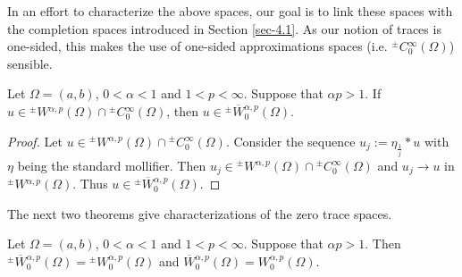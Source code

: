 \documentclass[leqno,final]{siamltex}
\numberwithin{equation}{section}
\renewcommand{\(}{\bigl(}
\renewcommand{\)}{\bigr)}
\newcommand{\R}{\mathbb{R}}
\begin{document}
    
    In an effort to characterize the above spaces, our goal is to link these spaces with the completion spaces introduced in Section \ref{sec-4.1}. As our notion of traces is one-sided,  
    this makes the use of one-sided approximations spaces (i.e. ${^{\pm}}{C}{^{\infty}_{0}}(\Omega)$) 
    sensible. 
    
    
    \begin{lemma}
         Let $\Omega=(a,b)$, $0 < \alpha <1$ and $1 < p <\infty$. Suppose that  $\alpha p >1$. If $u \in {^{\pm}}{W}{^{\alpha,p}}(\Omega) \cap {^{\pm}}{C}{^{\infty}_{0}}(\Omega)$, then $u \in {^{\pm}}{\overline{W}}{^{\alpha,p}_{0}}(\Omega)$.
    \end{lemma}

    \begin{proof}
        Let $u \in {^{\pm}}{W}{^{\alpha, p}}(\Omega) \cap {^{\pm}}{C}{^{\infty}_{0}}(\Omega)$. 
        Consider the sequence $u_j := \eta_{\frac{1}{j}}*u$ with $\eta$ being the standard mollifier. Then $u_j \in {^{\pm}}{W}{^{\alpha,p}}(\Omega) \cap {^{\pm}}{C}{^{\infty}_{0}}(\Omega)$ and $u_j \rightarrow u$ in ${^{\pm}}{W}{^{\alpha,p}}(\Omega)$. Thus $u \in {^{\pm}}{\overline{W}}{^{\alpha,p}_{0}}(\Omega)$. 
    \end{proof}

The next two theorems give characterizations of the zero trace spaces.

    \begin{theorem}\label{ZeroTrace}
         Let $\Omega=(a,b)$, $0 < \alpha <1$ and $1 < p <\infty$. Suppose that  $\alpha p >1$.
         Then $ {^{\pm}}{\overline{W}}{^{\alpha , p}_{0}}(\Omega)= {^{\pm}}{W}{^{\alpha,p}_{0}}(\Omega)$ and ${\overline{W}}{^{\alpha,p}_{0}}(\Omega) = W^{\alpha,p}_{0}(\Omega)$.
    \end{theorem}
\end{document}
